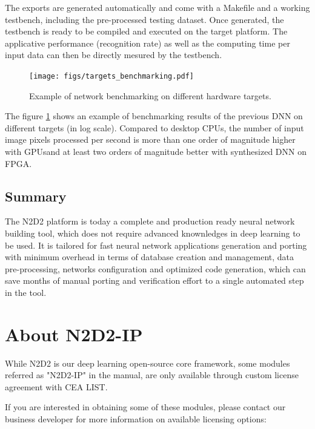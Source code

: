 \documentclass[a4paper,11pt,oneside]{article}
\newif\iffullmanual
\begin{document}
The exports are generated automatically and come with a Makefile and a working
 testbench, including the pre-processed testing dataset.
Once generated, the testbench is ready to be compiled and executed on the target
 platform. The applicative performance (recognition rate) as well as the
 computing time per input data can then be directly mesured by the testbench.

\begin{figure}[!htb]
  \centering
  \texttt{[image: figs/targets\_benchmarking.pdf]}
  \caption{Example of network benchmarking on different hardware targets.}
  \label{fig:TargetsBenchmarking}
\end{figure}

The figure \ref{fig:TargetsBenchmarking} shows an example of benchmarking
results of the previous DNN on different targets (in log scale).
Compared to desktop CPUs, the number of input image pixels processed per second
 is more than one order of magnitude higher with GPUsand at least two orders
 of magnitude better with synthesized DNN on FPGA.

\subsection{Summary}

The N2D2 platform is today a complete and production ready neural network
building tool, which does not require advanced knownledges in deep learning to
be used. It is tailored for fast neural network applications generation and
porting with minimum overhead in terms of database creation and management,
data pre-processing, networks configuration and optimized code generation,
which can save months of manual porting and verification effort to a single
automated step in the tool.


\clearpage


\iffullmanual

\clearpage
\section{\label{sec:N2D2-IP}About N2D2-IP}

While N2D2 is our deep learning open-source core framework, some modules referred as "N2D2-IP" in the manual, are only available through custom license agreement with CEA LIST.

If you are interested in obtaining some of these modules, please contact our business developer for more information on available licensing options:
\end{document}
